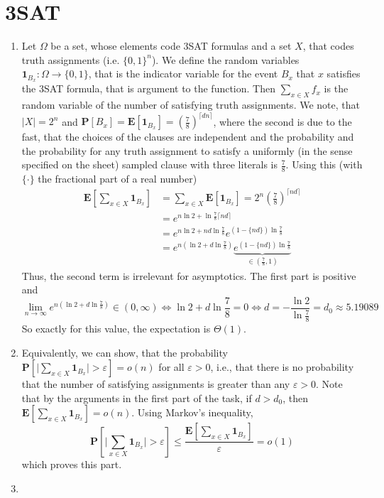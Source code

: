 \documentclass{scrartcl}
\newcommand\E{\mathbf{E}}
\renewcommand\P{\mathbf{P}}
\newcommand\1{\mathbf{1}}
\begin{document}
\section{3SAT}
\begin{enumerate}
\item
Let $\Omega$ be a set, whose elements code 3SAT formulas and a set $X$, that codes truth assignments (i.e. $\{0,1\}^n$). We define the random variables $\1_{B_x} \colon \Omega \rightarrow \{0,1\}$, that is the indicator variable for the event $B_x$ that $x$ satisfies the 3SAT formula, that is argument to the function. Then $\sum_{x \in X} f_x$ is the random variable of the number of satisfying truth assignments. We note, that $\lvert X \rvert = 2^n$ and $\P[B_x] = \E[\1_{B_x}] = (\frac{7}{8})^{\lceil dn \rceil}$, where the second is due to the fast, that the choices of the clauses are independent and the probability and the probability for any truth assignment to satisfy a uniformly (in the sense specified on the sheet) sampled clause with three literals is $\frac{7}{8}$. Using this (with $\{\cdot\}$ the fractional part of a real number)
\begin{align*}
\E[\sum_{x \in X} \1_{B_x}]&= \sum_{x \in X} \E[\1_{B_x}] = 2^n (\frac{7}{8})^{\lceil nd \rceil} \\
&=e^{n\ln 2 + \ln \frac{7}{8} \lceil nd \rceil}\\
&=e^{n\ln 2 + nd  \ln \frac{7}{8}} e^{(1-\{nd\}) \ln \frac{7}{8}}\\
&=e^{n(\ln 2 + d\ln \frac{7}{8})} \underbrace{e^{(1-\{nd\}) \ln \frac{7}{8}}}_{\in (\frac{7}{8}, 1)}
\end{align*}
Thus, the second term is irrelevant for asymptotics. The first part is positive and 
\[
\lim_{n\rightarrow \infty}e^{n(\ln 2 + d\ln \frac{7}{8})} \in (0,\infty) \Leftrightarrow \ln 2 + d\ln \frac{7}{8} = 0 \Leftrightarrow d= -\frac{\ln 2}{\ln \frac{7}{8}} =d_0 \approx 5.19089 
\]
So exactly for this value, the expectation is $\Theta (1)$.
\item
Equivalently, we can show, that the probability $\P[\lvert \sum_{x \in X} \1_{B_x}\rvert > \varepsilon] = o(n)$ for all $\varepsilon > 0$, i.e., that there is no probability that the number of satisfying assignments is greater than any $\varepsilon > 0$. Note that by the arguments in the first part of the task, if $d> d_0$, then $\E[\sum_{x \in X} \1_{B_x}] = o(n)$. Using Markov's inequality, 
\[
\P[\lvert \sum_{x \in X} \1_{B_x}\rvert > \varepsilon] \le \frac{\E[\sum_{x \in X}\1_{B_x}]}{\varepsilon}=o(1)
\]
which proves this part.
\item
\end{enumerate}
\end{document}

